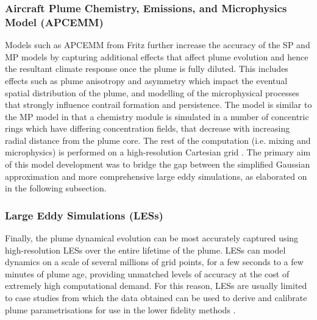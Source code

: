 \subsubsection{Aircraft Plume Chemistry, Emissions, and Microphysics Model (APCEMM)}
Models such as APCEMM from Fritz \cite{Fritz2018} further increase the accuracy of the SP and MP models by capturing additional effects that affect plume evolution and hence the resultant climate response once the plume is fully diluted. This includes effects such as plume anisotropy and asymmetry which impact the eventual spatial distribution of the plume, and modelling of the microphysical processes that strongly influence contrail formation and persistence. The model is similar to the MP model in that a chemistry module is simulated in a number of concentric rings which have differing concentration fields, that decrease with increasing radial distance from the plume core. The rest of the computation (i.e. mixing and microphysics) is performed on a high-resolution Cartesian grid \cite{FritzConvo}. The primary aim of this model development was to bridge the gap between the simplified Gaussian approximation and more comprehensive large eddy simulations, as elaborated on in the following subsection.


\subsubsection{Large Eddy Simulations (LESs)}
Finally, the plume dynamical evolution can be most accurately captured using high-resolution LESs over the entire lifetime of the plume. LESs can model dynamics on a scale of several millions of grid points, for a few seconds to a few minutes of plume age, providing unmatched levels of accuracy at the cost of extremely high computational demand. For this reason, LESs are usually limited to case studies from which the data obtained can be used to derive and calibrate plume parametrisations for use in the lower fidelity methods \cite{Lewellen1998}. 

